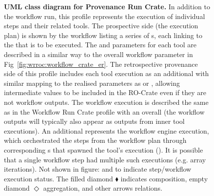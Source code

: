 \begin{figure}[!htb]
\caption{{\bf UML class diagram for Provenance Run Crate.}
In addition to the workflow run, this profile represents the execution of individual steps and their related tools.
The prospective side (the execution plan) is shown by the workflow listing a series of s, each linking to the  that is to be executed. The  and  parameters for each tool are described in a similar way to the overall workflow parameter in Fig~\ref{fig:wrroc:workflow_crate_er}.
The retrospective provenance side of this profile includes each tool execution as an additional  with similar mapping to the realised parameters as  or , allowing intermediate values to be included in the RO-Crate even if they are not workflow outputs.
The workflow execution is described the same as in the Workflow Run Crate profile with an overall  (the workflow outputs will typically also appear as outputs from inner tool executions). An additional  represents the workflow engine execution, which orchestrated the steps from the workflow plan through corresponding s that spawned the tool's execution (). It is possible that a single workflow step had multiple such executions (e.g. array iterations). Not shown in figure:  and  to indicate step/workflow execution status.
The filled diamond $\blacklozenge$ indicates composition, empty diamond $\Diamond$ aggregation, and other arrows relations.
}
\label{fig:wrroc:provenance_crate_er}
\end{figure}

